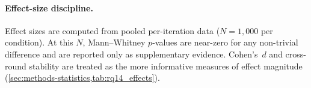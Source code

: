 \paragraph{Effect-size discipline.}
Effect sizes are computed from pooled per-iteration data
($N = 1{,}000$ per condition). At this $N$, Mann--Whitney $p$-values are
near-zero for any non-trivial difference and are reported only as
supplementary evidence. Cohen's~$d$ and cross-round stability are treated as
the more informative measures of effect magnitude
(\cref{sec:methods-statistics,tab:rq14_effects}).
